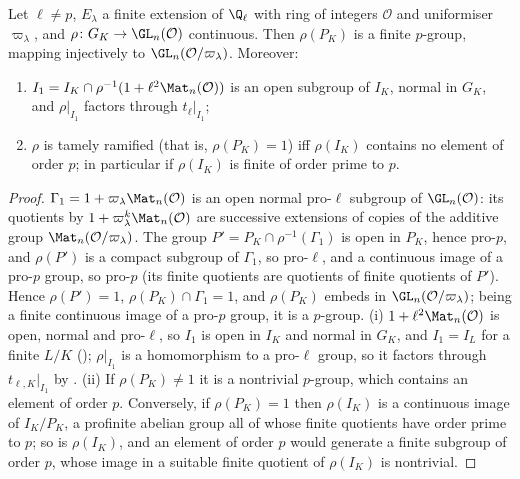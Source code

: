 \begin{proposition}\label{prop:local:wild-image}
Let $\ell\ne p$, $E_\lambda$ a finite extension of $\Q_\ell$ with ring of integers $\mathcal O$ and uniformiser $\varpi_\lambda$, and $\rho\colon G_K\to\GL_n(\mathcal O)$
continuous. Then $\rho(P_K)$ is a finite $p$-group, mapping injectively to $\GL_n(\mathcal O/\varpi_\lambda)$. Moreover:
\begin{enumerate}[label=(\roman*)]
\item $I_1=I_K\cap\rho^{-1}(1+\ell^2\Mat_n(\mathcal O))$ is an open subgroup of $I_K$, normal in $G_K$, and $\rho|_{I_1}$ factors through $t_\ell|_{I_1}$;
\item $\rho$ is tamely ramified (that is, $\rho(P_K)=1$) iff $\rho(I_K)$ contains no element of order $p$; in particular if $\rho(I_K)$ is finite of order
prime to $p$.
\end{enumerate}
\end{proposition}

\begin{proof}
$\Gamma_1=1+\varpi_\lambda\Mat_n(\mathcal O)$ is an open normal pro-$\ell$ subgroup of $\GL_n(\mathcal O)$: its quotients by $1+\varpi_\lambda^k\Mat_n(\mathcal O)$ are
successive extensions of copies of the additive group $\Mat_n(\mathcal O/\varpi_\lambda)$. The group $P'=P_K\cap\rho^{-1}(\Gamma_1)$ is open in $P_K$, hence pro-$p$,
and $\rho(P')$ is a compact subgroup of $\Gamma_1$, so pro-$\ell$, and a continuous image of a pro-$p$ group, so pro-$p$ (its finite quotients are
quotients of finite quotients of $P'$). Hence $\rho(P')=1$, $\rho(P_K)\cap\Gamma_1=1$, and $\rho(P_K)$ embeds in $\GL_n(\mathcal O/\varpi_\lambda)$; being a finite
continuous image of a pro-$p$ group, it is a $p$-group. (i) $1+\ell^2\Mat_n(\mathcal O)$ is open, normal and pro-$\ell$, so $I_1$ is open in $I_K$ and normal in
$G_K$, and $I_1=I_L$ for a finite $L/K$ (); $\rho|_{I_1}$ is a homomorphism to a pro-$\ell$ group, so it factors through $t_{\ell,K}|_{I_1}$ by
. (ii) If $\rho(P_K)\ne1$ it is a nontrivial $p$-group, which contains an element of order $p$. Conversely, if $\rho(P_K)=1$ then
$\rho(I_K)$ is a continuous image of $I_K/P_K$, a profinite abelian group all of whose finite quotients have order prime to $p$; so is $\rho(I_K)$, and an
element of order $p$ would generate a finite subgroup of order $p$, whose image in a suitable finite quotient of $\rho(I_K)$ is nontrivial.
\end{proof}

